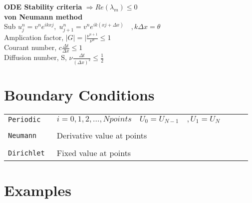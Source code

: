 \documentclass[8pt]{extarticle} %
\begin{document}
\begin{multicols*}{3}
 \vspace{1ex}
 \textbf{ODE Stability criteria} $\Rightarrow Re(\lambda_m)\leq 0$\\
 \vspace{1ex}
 \textbf{von Neumann method}\\
 \vspace{1ex}
 Sub $u_j^n = v^ne^{ikxj},\;u_{j+1}^n=v^ne^{ik(xj+\Delta x)}\quad,k\Delta x=\theta$\\
 Amplication factor, $|G|=|\frac{\nu^{n+1}}{\nu^n}\leq1$\\
 Courant number, $c\frac{\Delta t}{\Delta x}\leq1$\\
 Diffusion number, S, $\nu\frac{\Delta t}{(\Delta x)^2}\leq\frac{1}{2}$
 
 \section{Boundary Conditions}
  \begin{tabular}{L{0.2\linewidth} L{1\linewidth}}
  \tt Periodic & $i=0,1,2,...,N points\quad U_0=U_{N-1}\quad,U_1=U_{N}$\\
  \\[-0.9em]
  \tt Neumann & Derivative value at points\\
  \\[-0.9em]
  \tt Dirichlet & Fixed value at points
  \end{tabular}
  
  \section{Examples}

\end{multicols*}
\end{document}
